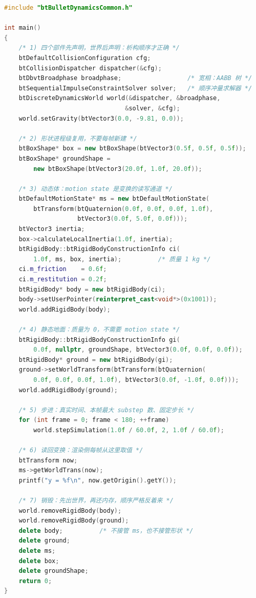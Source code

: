 \documentclass[12pt,a4paper,fontset=fandol]{ctexbook}
\begin{document}
\begin{lstlisting}[language=C++, style=cppstyle, caption={建世界、加两个刚体、步进、读回变换（Bullet 形状，可编译骨架）}, label={lst:ch13-bullet-world}]
#include "btBulletDynamicsCommon.h"

int main()
{
    /* 1) 四个部件先声明，世界后声明：析构顺序才正确 */
    btDefaultCollisionConfiguration cfg;
    btCollisionDispatcher dispatcher(&cfg);
    btDbvtBroadphase broadphase;                  /* 宽相：AABB 树 */
    btSequentialImpulseConstraintSolver solver;   /* 顺序冲量求解器 */
    btDiscreteDynamicsWorld world(&dispatcher, &broadphase,
                                 &solver, &cfg);
    world.setGravity(btVector3(0.0, -9.81, 0.0));

    /* 2) 形状进程级复用，不要每帧新建 */
    btBoxShape* box = new btBoxShape(btVector3(0.5f, 0.5f, 0.5f));
    btBoxShape* groundShape =
        new btBoxShape(btVector3(20.0f, 1.0f, 20.0f));

    /* 3) 动态体：motion state 是变换的读写通道 */
    btDefaultMotionState* ms = new btDefaultMotionState(
        btTransform(btQuaternion(0.0f, 0.0f, 0.0f, 1.0f),
                    btVector3(0.0f, 5.0f, 0.0f)));
    btVector3 inertia;
    box->calculateLocalInertia(1.0f, inertia);
    btRigidBody::btRigidBodyConstructionInfo ci(
        1.0f, ms, box, inertia);          /* 质量 1 kg */
    ci.m_friction    = 0.6f;
    ci.m_restitution = 0.2f;
    btRigidBody* body = new btRigidBody(ci);
    body->setUserPointer(reinterpret_cast<void*>(0x1001));
    world.addRigidBody(body);

    /* 4) 静态地面：质量为 0，不需要 motion state */
    btRigidBody::btRigidBodyConstructionInfo gi(
        0.0f, nullptr, groundShape, btVector3(0.0f, 0.0f, 0.0f));
    btRigidBody* ground = new btRigidBody(gi);
    ground->setWorldTransform(btTransform(btQuaternion(
        0.0f, 0.0f, 0.0f, 1.0f), btVector3(0.0f, -1.0f, 0.0f)));
    world.addRigidBody(ground);

    /* 5) 步进：真实时间、本帧最大 substep 数、固定步长 */
    for (int frame = 0; frame < 180; ++frame)
        world.stepSimulation(1.0f / 60.0f, 2, 1.0f / 60.0f);

    /* 6) 读回变换：渲染侧每帧从这里取值 */
    btTransform now;
    ms->getWorldTrans(now);
    printf("y = %f\n", now.getOrigin().getY());

    /* 7) 销毁：先出世界，再还内存，顺序严格反着来 */
    world.removeRigidBody(body);
    world.removeRigidBody(ground);
    delete body;          /* 不接管 ms，也不接管形状 */
    delete ground;
    delete ms;
    delete box;
    delete groundShape;
    return 0;
}
\end{lstlisting}
\end{document}
